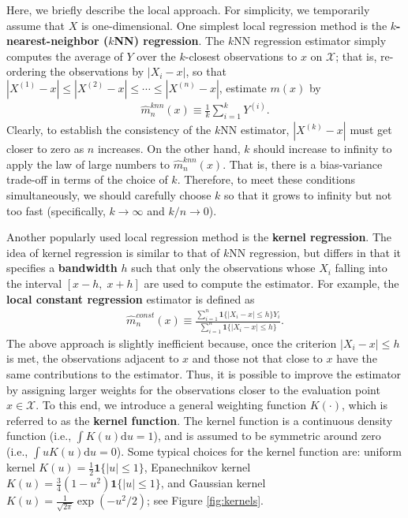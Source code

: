 \documentclass[11pt, A4paper, openany, uplatex]{book}
\begin{document}
Here, we briefly describe the local approach.
For simplicity, we temporarily assume that $X$ is one-dimensional.
One simplest local regression method is the \textbf{$k$-nearest-neighbor ($k$NN) regression}.
The $k$NN regression estimator simply computes the average of $Y$ over the $k$-closest observations to $x$ on $\mathcal{X}$; that is, re-ordering the observations by $|X_i - x|$, so that $|X^{(1)} - x| \le |X^{(2)} - x| \le \cdots \le |X^{(n)} - x|$, estimate $m(x)$ by
\begin{align*}
	\hat m^{knn}_n(x) \equiv \frac{1}{k}\sum_{i = 1}^k Y^{(i)}.
\end{align*}
Clearly, to establish the consistency of the $k$NN estimator, $|X^{(k)} - x|$ must get closer to zero as $n$ increases.
On the other hand, $k$ should increase to infinity to apply the law of large numbers to $\hat m^{knn}_n(x)$. 
That is, there is a bias-variance trade-off in terms of the choice of $k$.
Therefore, to meet these conditions simultaneously, we should carefully choose $k$ so that it grows to infinity but not too fast (specifically, $k \to \infty$ and $k/n \to 0$).

Another popularly used local regression method is the \textbf{kernel regression}.
The idea of kernel regression is similar to that of $k$NN regression, but differs in that it specifies a \textbf{bandwidth} $h$ such that only the observations whose $X_i$ falling into the interval $[x-h, \; x+h]$ are used to compute the estimator.
For example, the \textbf{local constant regression} estimator is defined as
\begin{align*}
	\hat m^{const}_n(x) \equiv \frac{\sum_{i = 1}^n \mathbf{1}\{|X_i - x | \le h\} Y_i}{\sum_{i = 1}^n\mathbf{1}\{|X_i - x | \le h\}}.
\end{align*}
The above approach is slightly inefficient because, once the criterion $|X_i - x | \le h$ is met, the observations adjacent to $x$ and those not that close to $x$ have the same contributions to the estimator.
Thus, it is possible to improve the estimator by assigning larger weights for the observations closer to the evaluation point $x \in \mathcal{X}$. 
To this end, we introduce a general weighting function $K(\cdot)$, which is referred to as the \textbf{kernel function}.
The kernel function is a continuous density function (i.e., $\int K(u)\text{d}u = 1$), and is assumed to be symmetric around zero (i.e., $\int u K(u)\text{d}u = 0$).
Some typical choices for the kernel function are: uniform kernel $K(u) = \frac{1}{2}\mathbf{1}\{|u| \le 1\}$, Epanechnikov kernel $K(u) = \frac{3}{4}(1-u^2)\mathbf{1}\{|u| \le 1\}$, and Gaussian kernel $K(u) = \frac{1}{\sqrt{2\pi}}\exp(-u^2/2)$; see Figure \ref{fig:kernels}.
\end{document}
